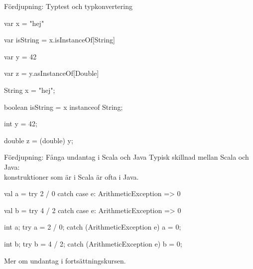 \begin{Slide}{Fördjupning: Typtest och typkonvertering}

\begin{multicols}{2}
  \noindent{}
\begin{CodeSmall}[basicstyle=\small\ttfamily\SlideFontSize{6}{8},backgroundcolor=\color{white},
  frame=none]
var x = "hej"

var isString = x.isInstanceOf[String]

var y = 42

var z = y.asInstanceOf[Double]

\end{CodeSmall}

\columnbreak

\noindent{}
\begin{CodeSmall}[language=Java,basicstyle=\small\ttfamily\SlideFontSize{6}{8},backgroundcolor=\color{white},
  frame=none]
String x = "hej";

boolean isString = x instanceof String;

int y = 42;

double z = (double) y;
\end{CodeSmall}
\end{multicols}


\end{Slide}


\begin{Slide}{Fördjupning: Fånga undantag i Scala och Java}
Typisk skillnad mellan Scala och Java:\\konstruktioner som är  i Scala är ofta  i Java.
\begin{multicols}{2}
  \noindent{}
\begin{CodeSmall}[basicstyle=\ttfamily\SlideFontSize{6}{8},backgroundcolor=\color{white},
  frame=none]
val a = try { 2 / 0 } catch {
  case e: ArithmeticException => 0
}

val b = try { 4 / 2 } catch {
  case e: ArithmeticException => 0
}
\end{CodeSmall}

\columnbreak

\noindent{}
\begin{CodeSmall}[language=Java,basicstyle=\ttfamily\SlideFontSize{6}{8},backgroundcolor=\color{white},
  frame=none]
int a;
try {
    a = 2 / 0;
} catch (ArithmeticException e) {
    a = 0;
}

int b;
try {
    b = 4 / 2;
} catch (ArithmeticException e) {
    b = 0;
}

\end{CodeSmall}
\end{multicols}

Mer om undantag  i fortsättningskursen.
\end{Slide}




